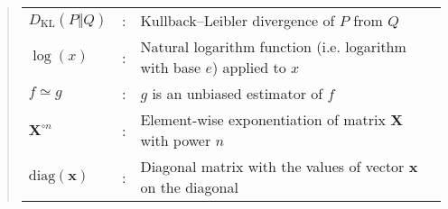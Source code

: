 \documentclass[ oneside,%
                    author={George Herbert},
                    degree={MSci},
                     title={Diffusion Models for Time-Evolving Precipitation Fields},
                  subtitle={}]{dissertation}
\begin{document}
\begin{quote}
\noindent
\begin{tabular}{lcl}
      $D_{\mathrm{KL}}(P\Vert Q)$ &: & Kullback--Leibler divergence of $P$ from $Q$\\
      $\log(x)$ &: & Natural logarithm function (i.e. logarithm with base $e$) applied to $x$\\
      $f\simeq g$ &: & $g$ is an unbiased estimator of $f$\\
      $\mathbf{X}^{\circ n}$ &: & Element-wise exponentiation of matrix $\mathbf{X}$ with power $n$\\
      $\mathrm{diag}(\mathbf{x})$ &: & Diagonal matrix with the values of vector $\mathbf{x}$ on the diagonal\\
\end{tabular}
\end{quote}


\end{document}
